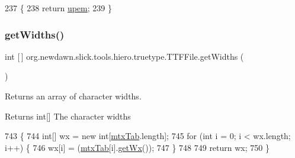 \begin{DoxyCode}
237                          \{
238         \textcolor{keywordflow}{return} \mbox{\hyperlink{classorg_1_1newdawn_1_1slick_1_1tools_1_1hiero_1_1truetype_1_1_t_t_f_file_a8250ffa3465ce98f553e94c1dec0287f}{upem}};
239     \}
\end{DoxyCode}
\mbox{\label{classorg_1_1newdawn_1_1slick_1_1tools_1_1hiero_1_1truetype_1_1_t_t_f_file_a3902cda69ad80892e98498cd86f3e779}} 
\subsubsection{\texorpdfstring{get\+Widths()}{getWidths()}}
{\footnotesize\ttfamily int \mbox{[}$\,$\mbox{]} org.\+newdawn.\+slick.\+tools.\+hiero.\+truetype.\+T\+T\+F\+File.\+get\+Widths (\begin{DoxyParamCaption}{ }\end{DoxyParamCaption})\hspace{0.3cm}{\ttfamily [inline]}}

Returns an array of character widths. \begin{DoxyReturn}{Returns}
int\mbox{[}\mbox{]} The character widths 
\end{DoxyReturn}

\begin{DoxyCode}
743                              \{
744         \textcolor{keywordtype}{int}[] wx = \textcolor{keyword}{new} \textcolor{keywordtype}{int}[\mbox{\hyperlink{classorg_1_1newdawn_1_1slick_1_1tools_1_1hiero_1_1truetype_1_1_t_t_f_file_ad78a13682e242fc4a0b5d34a8e5807fa}{mtxTab}}.length];
745         \textcolor{keywordflow}{for} (\textcolor{keywordtype}{int} i = 0; i < wx.length; i++) \{
746             wx[i] = (\mbox{\hyperlink{classorg_1_1newdawn_1_1slick_1_1tools_1_1hiero_1_1truetype_1_1_t_t_f_file_ad78a13682e242fc4a0b5d34a8e5807fa}{mtxTab}}[i].\mbox{\hyperlink{classorg_1_1newdawn_1_1slick_1_1tools_1_1hiero_1_1truetype_1_1_t_t_f_mtx_entry_a4c40c027116d90af1d603f06f38d9919}{getWx}}());
747         \}
748 
749         \textcolor{keywordflow}{return} wx;
750     \}
\end{DoxyCode}
\mbox{\label{classorg_1_1newdawn_1_1slick_1_1tools_1_1hiero_1_1truetype_1_1_t_t_f_file_a1a4c322aa67c0b7be8b13cb20eb57e19}} 
